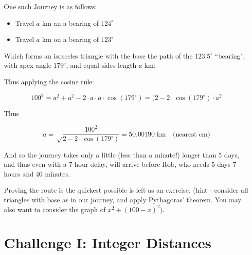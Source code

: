 \documentclass{article}
\begin{document}
\begin{enumerate}
One such Journey is as follows:
\begin{itemize}
    \item Travel $a$ km an a bearing of $124^\circ$ 
    \item Travel $a$ km on a bearing of $123^\circ$
\end{itemize}

Which forms an isosceles triangle with the base the path of the $123.5^\circ$ ``bearing", with apex angle $179^\circ$, and equal sides length $a$ km;

Thus applying the cosine rule:

$$
100^2 = a^2 + a^2 - 2 \cdot a \cdot a \cdot \cos(179^\circ) = (2-2\cdot \cos(179^\circ) \cdot a^2
$$

Thus

$$
a = \sqrt\frac{100^2}{2 - 2\cdot \cos(179^\circ)} = 50.00190 \; \text{km} \quad \text{(nearest cm)}
$$

And so the journey takes only a little (less than a minute!) longer than $5$ days, and thus even with a $7$ hour delay, will arrive before Rob, who needs $5$ days $7$ hours and $40$ minutes.

Proving the route is the quickest possible is left as an exercise, (hint - consider all triangles with base as in our journey, and apply Pythagoras' theorem. You may also want to consider the graph of $x^2 + (100-x)^2$).


\end{enumerate}

\newpage

\section{Challenge I: Integer Distances}
\end{document}
